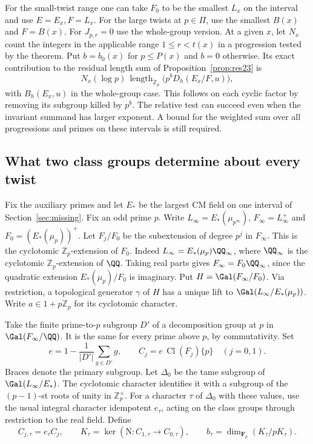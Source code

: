 \documentclass[a4paper,11pt]{article}
\theoremstyle{definition}
\theoremstyle{remark}
\newcommand{\ZZ}{\mathbb Z}\newcommand{\ord}{\operatorname{ord}}
\newcommand{\len}{\operatorname{length}}\newcommand{\Res}{\operatorname*{Res}}
\numberwithin{equation}{section}
\newcommand{\Cl}{\operatorname{Cl}}
\begin{document}
For the small-twist range one can take \(F_0\) to be the
smallest \(L_x\) on the interval and use \(E=E_x,F=L_x\).
For the large twists at \(p\in\Pi\), use the smallest
\(B(x)\) and \(F=B(x)\). For \(J_{p,r}=0\) use the
whole-group version. At a given \(x\), let \(N_x\) count
the integers in the applicable range \(1\le r<t(x)\)
in a progression tested by the theorem. Put \(b=b_0(x)\)
for \(p\le P(x)\) and \(b=0\) otherwise. Its exact
contribution to the residual length sum of
Proposition~\ref{prop:res23} is
\[
       N_x(\log p)\,\len_{\ZZ_p}\bigl(p^b D_h(E_x/F,u)\bigr),
\]
with \(B_h(E_x,u)\) in the whole-group case. This follows
on each cyclic factor by removing its subgroup killed by
\(p^b\). The relative test can succeed even when the
invariant summand has larger exponent. A bound for the
weighted sum over all progressions and primes on these
intervals is still required.

\subsection{What two class groups determine about every twist}\label{nav:II-80}
Fix the auxiliary primes and let \(E_*\) be the largest CM field on
one interval of Section~\ref{sec:missing}. Fix an odd prime \(p\).
Write \(L_\infty=E_*(\mu_{p^\infty})\), \(F_\infty=L_\infty^+\)
and \(F_0=(E_*(\mu_p))^+\). Let \(F_j/F_0\) be the subextension
of degree \(p^j\) in \(F_\infty\). This is the cyclotomic
\(\ZZ_p\)-extension of \(F_0\). Indeed
\(L_\infty=E_*(\mu_p)\QQ_\infty\), where \(\QQ_\infty\) is
the cyclotomic \(\ZZ_p\)-extension of \(\QQ\). Taking real parts
gives \(F_\infty=F_0\QQ_\infty\), since the quadratic extension
\(E_*(\mu_p)/F_0\) is imaginary. Put \(H=\Gal(F_\infty/F_0)\).
Via restriction, a topological generator \(\gamma\) of \(H\)
has a unique lift to \(\Gal(L_\infty/E_*(\mu_p))\). Write
\(a\in 1+p\ZZ_p\) for its cyclotomic character.

Take the finite prime-to-\(p\) subgroup \(D'\) of a decomposition
group at \(p\) in \(\Gal(F_\infty/\QQ)\). It is the same for
every prime above \(p\), by commutativity. Set
\[
 e=1-\frac1{|D'|}\sum_{g\in D'}g,\qquad
 C_j=e\,\Cl(F_j)\{p\}\quad(j=0,1).
\]
Braces denote the primary subgroup. Let \(\Delta_0\) be the tame
subgroup of \(\Gal(L_\infty/E_*)\). The cyclotomic character
identifies it with a subgroup of the \((p-1)\)-st roots of unity
in \(\ZZ_p^\times\). For a character \(\tau\) of \(\Delta_0\)
with these values, use the usual integral character idempotent
\(e_\tau\), acting on the class groups through restriction to the
real field. Define
\[
 C_{j,\tau}=e_\tau C_j,\qquad
 K_\tau=\ker\!\left(\mathrm N:C_{1,\tau}\longrightarrow C_{0,\tau}\right),
 \qquad b_\tau=\dim_{\mathbf F_p}(K_\tau/pK_\tau).
\]
\end{document}

